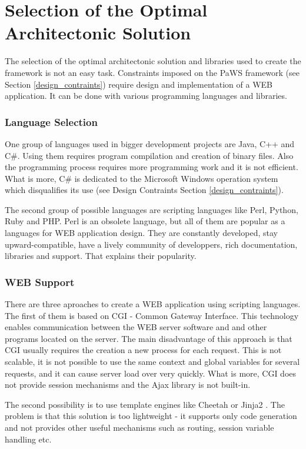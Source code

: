 \section{Selection of the Optimal Architectonic Solution}

The selection of the optimal architectonic solution and libraries used
to create the framework is not an easy task. Constraints imposed on
the PaWS framework (see Section \ref{design_contraints}) require
design and implementation of a WEB application. It can be done with various
programming languages and libraries.

\subsubsection{Language Selection}

One group of languages used in bigger development projects are Java,
C++ and C\#. Using them requires program compilation and creation of
binary files. Also the programming process requires more programming
work and it is not efficient. What is more, C\# is dedicated to the
Microsoft Windows operation system which disqualifies its use (see
Design Contraints Section \ref{design_contraints}).

The second group of possible languages are scripting languages like
Perl, Python, Ruby and PHP. Perl is an obsolete language, but all of
them are popular as a languages for WEB application design. They are
constantly developed, stay upward-compatible, have a lively community
of developpers, rich documentation, libraries and support. That
explains their popularity.

\subsubsection{WEB Support}

There are three aproaches to create a WEB application using scripting
languages. The first of them is based on CGI\cite{cgi} - Common
Gateway Interface. This technology enables communication between the WEB
server software and and other programs located on the server. The main
disadvantage of this approach is that CGI usually requires the
creation a new process for each request. This is not scalable, it is
not possible to use the same context and global variables for several
requests, and it can cause server load over very quickly. What is more,
CGI does not provide session mechanisms and the Ajax library is not
built-in.

The second possibility is to use template engines like Cheetah
\cite{cheetah} or Jinja2 \cite{jinja2}. The problem is that this
solution is too lightweight - it supports only code generation and not
provides other useful mechanisms such as routing, session variable
handling etc.

